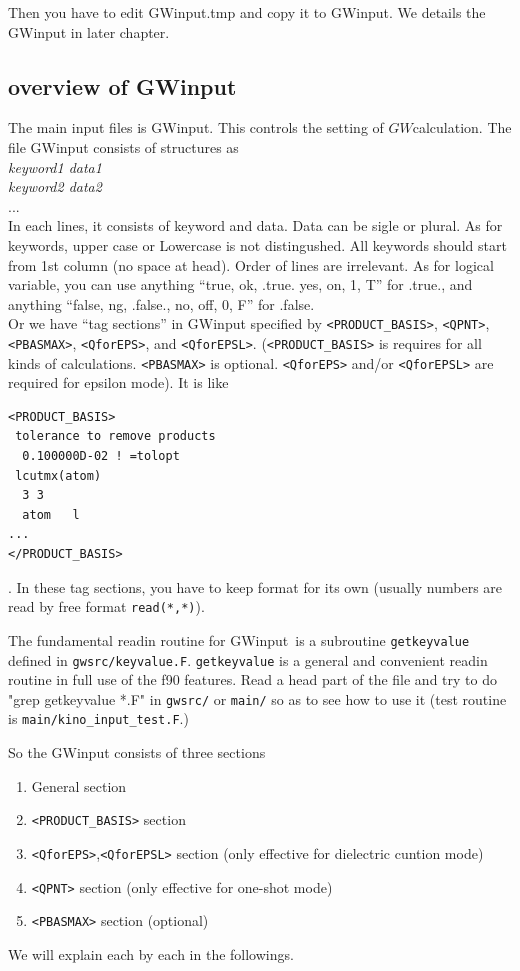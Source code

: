 \documentclass[a4paper,10pt,epsf,fleqn]{article}
\newcommand{\GW}{$GW$}
\newcommand{\GWinput}{{\sf GWinput}\ }
\begin{document}
{Then you have to edit {\sf GWinput.tmp} and copy it to
{\sf GWinput}. We details the {\sf GWinput} in later chapter.


\subsection{overview of GWinput}
The main input files is {\sf GWinput}.
This controls the setting of \GW calculation.
The file {\sf GWinput} consists of
structures as\\
{\it keyword1 data1}\\
{\it keyword2 data2}\\
...\\
In each lines, it consists of keyword and data. 
Data can be sigle or plural.
As for keywords, upper case or Lowercase is not distingushed.
All keywords should start from 1st column (no space at head).
Order of lines are irrelevant.
As for logical variable, you can use 
anything ``true, ok, .true. yes, on, 1, T'' for .true.,
and anything ``false, ng, .false., no, off, 0, F'' for .false.\\

Or we have ``tag sections'' in {\sf GWinput} 
specified by \verb#<PRODUCT_BASIS>#, 
\verb#<QPNT>#,  \verb#<PBASMAX>#, \verb#<QforEPS>#, and \verb#<QforEPSL>#.
(\verb#<PRODUCT_BASIS># is requires for all kinds of calculations.
\verb#<PBASMAX># is optional. \verb#<QforEPS># and/or \verb#<QforEPSL># are required
for epsilon mode). It is like
\begin{verbatim}
<PRODUCT_BASIS>
 tolerance to remove products
  0.100000D-02 ! =tolopt
 lcutmx(atom) 
  3 3 
  atom   l
...
</PRODUCT_BASIS>
\end{verbatim}
. In these tag sections, you have to keep format for its own
(usually numbers are read by free format \verb#read(*,*)#).

The fundamental readin routine for \GWinput is a subroutine 
\verb#getkeyvalue# defined in \verb#gwsrc/keyvalue.F#.
\verb#getkeyvalue# is a general and convenient readin routine in full use of the f90 features.
Read a head part of the file and try to do "grep getkeyvalue *.F" 
in \verb#gwsrc/# or \verb#main/# so as to see how to use it
(test routine is \verb#main/kino_input_test.F#.)

So the {\sf GWinput} consists of three sections \\
\begin{enumerate}
 \item General section 
 \item \verb#<PRODUCT_BASIS># section
 \item \verb#<QforEPS>#,\verb#<QforEPSL># section (only effective for
dielectric cuntion mode)
 \item \verb#<QPNT># section (only effective for one-shot mode)
 \item \verb#<PBASMAX># section (optional)
\end{enumerate}
We will explain each by each in the followings.

}
\end{document}
